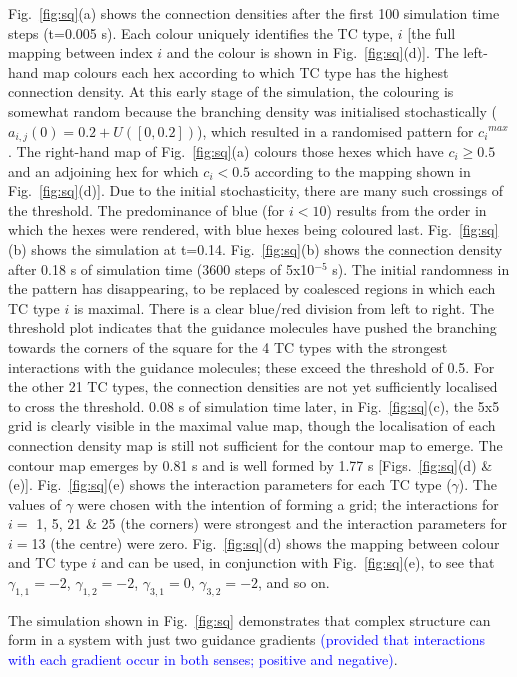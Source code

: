 \documentclass[a4paper,11pt]{article}
\newcommand{\cmnt}[1]{\textcolor{blue}{#1}}
\begin{document}
Fig.~\ref{fig:sq}(a) shows the connection densities after the first 100
simulation time steps (t=0.005 s). Each colour uniquely identifies the TC
type, $i$ [the full mapping between index $i$ and the colour is shown in
  Fig.~\ref{fig:sq}(d)]. The left-hand map colours each hex according to
which TC type has the highest connection density. At this early stage of the
simulation, the colouring is somewhat random because the branching density was
initialised stochastically ($a_{i,j}(0) = 0.2 + U([0,0.2])$), which resulted
in a randomised pattern for ${c_i}^{max}$. The right-hand map of
Fig.~\ref{fig:sq}(a) colours those hexes which have $c_i \geq 0.5$ and an
adjoining hex for which $c_i < 0.5$ according to the mapping shown in
Fig.~\ref{fig:sq}(d)]. Due to the initial stochasticity, there are many
  such crossings of the threshold. The predominance of blue (for $i<10$)
  results from the order in which the hexes were rendered, with blue hexes
  being coloured last.  Fig.~\ref{fig:sq}(b) shows the simulation at
  t=0.14.
%
%
Fig.~\ref{fig:sq}(b) shows the connection density after 0.18 s of simulation
time (3600 steps of 5x10$^{-5}$ s). The initial randomness in the pattern has
disappearing, to be replaced by coalesced regions in which each TC type $i$ is
maximal.  There is a clear blue/red division from left to right. The threshold
plot indicates that the guidance molecules have pushed the branching towards
the corners of the square for the 4 TC types with the strongest interactions
with the guidance molecules; these exceed the threshold of 0.5. For the other
21 TC types, the connection densities are not yet sufficiently localised to
cross the threshold.
%
0.08 s of simulation time later, in Fig.~\ref{fig:sq}(c), the 5x5 grid is
clearly visible in the maximal value map, though the localisation of each
connection density map is still not sufficient for the contour map to emerge.
%
The contour map emerges by 0.81 s and is well formed by 1.77 s
[Figs.~\ref{fig:sq}(d) \& (e)]. Fig.~\ref{fig:sq}(e) shows the interaction
parameters for each TC type ($\gamma$). The values of $\gamma$ were chosen
with the intention of forming a grid; the interactions for $i =$ 1, 5, 21 \&
25 (the corners) were strongest and the interaction parameters for $i=$13 (the
centre) were zero. Fig.~\ref{fig:sq}(d) shows the mapping between colour and
TC type $i$ and can be used, in conjunction with Fig.~\ref{fig:sq}(e), to see
that $\gamma_{1,1}=-2$, $\gamma_{1,2}=-2$, $\gamma_{3,1}=0$,
$\gamma_{3,2}=-2$, and so on.

The simulation shown in Fig.~\ref{fig:sq} demonstrates that complex structure
can form in a system with just two guidance gradients \cmnt{(provided that
  interactions with each gradient occur in both senses; positive and negative)}.
\end{document}
